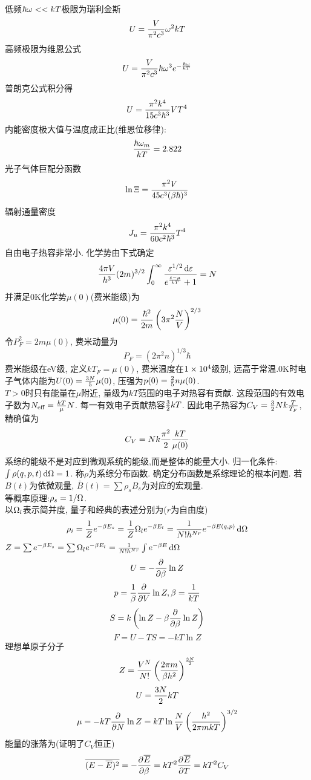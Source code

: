\documentclass[UTF8,8pt]{ctexart}
\newcommand{\q}[1]{{\color{red} #1}}
\begin{document}
\begin{multicols}{3}
低频$\hbar\omega<<kT$极限为瑞利金斯
$$U=\frac{V}{\pi^2c^3}\omega^2kT$$
高频极限为维恩公式
$$U=\frac{V}{\pi^2c^3}\hbar\omega^3e^{-\frac{\hbar\omega}{kT}}$$
普朗克公式积分得
$$U=\frac{\pi^2k^4}{15c^3\hbar^3}VT^4$$
内能密度极大值与温度成正比(维恩位移律):
$$\frac{\hbar\omega_m}{kT}=2.822$$
光子气体巨配分函数
$$\ln\Xi=\frac{\pi^2V}{45c^3(\beta\hbar)^3}$$
辐射通量密度
$$J_u=\frac{\pi^2k^4}{60c^2\hbar^3}T^4$$
自由电子热容非常小. 化学势由下式确定
$$\frac{4\pi V}{h^3}(2m)^{3/2}\int_0^\infty \frac{\varepsilon^{1/2}\mathop{}\!\mathrm{d}\varepsilon}{e^{\frac{\varepsilon-\mu}{kT}}+1}=N$$
并满足0K化学势$\mu(0)$(费米能级)为
$$\mu(0)=\frac{\hbar^2}{2m}\left( 3\pi^2\frac{N}{V} \right)^{2/3}$$
令$P_F^2=2m\mu(0)$, 费米动量为
$$P_F=(2\pi^2n)^{1/3}\hbar$$
费米能级在eV级, 定义$kT_F=\mu(0)$, 费米温度在$1\times 10^{4}$级别, 远高于常温.0K时电子气体内能为$U(0)=\frac{3N}{5}\mu(0)$, 压强为$p(0)=\frac{2}{5}n\mu(0)$. \\
$T>0$时只有能量在$\mu$附近, 量级为$kT$范围的电子对热容有贡献. 这段范围的有效电子数为$N_{\text{eff}}=\frac{kT}{\mu}N$. 每一有效电子贡献热容$\frac{3}{2}kT$. 因此电子热容为$C_V=\frac{3}{2}Nk\frac{T}{T_F}$, 精确值为
$$C_V=Nk\frac{\pi^2}{2}\frac{kT}{\mu(0)}$$
系综的能级不是对应到微观系统的能级,而是整体的能量大小. 
归一化条件:$\int\rho(q,p,t)\mathop{}\!\mathrm{d}\Omega=1$. 称$\rho$为系综分布函数. \q{确定分布函数是系综理论的根本问题}. 若$B(t)$为依微观量, $\bar{B}(t)=\sum \rho_sB_s$为对应的宏观量. \\
等概率原理:$\rho_s=1/\Omega$.\\
以$\Omega_l$表示简并度, 量子和经典的表述分别为($r$为自由度)
$$\rho_i=\frac{1}{Z}e^{-\beta E_s} = \frac{1}{Z}\Omega_le^{-\beta E_l} = \frac{1}{N!h^{Nr}}e^{-\beta E(q,p)}\mathop{}\!\mathrm{d}\Omega$$
$Z=\sum e^{-\beta E_s}=\sum\Omega_le^{-\beta E_l}=\frac{1}{N!h^{Nr}}\int e^{-\beta E}\mathop{}\!\mathrm{d}\Omega$
$$U = -\frac{\partial^{} }{\partial {\beta}^{}}\ln Z$$
$$p = \frac{1}{\beta}\frac{\partial^{} }{\partial {V}^{}}\ln Z, \beta=\frac{1}{kT}$$
$$S = k\left( \ln Z-\beta\frac{\partial^{} }{\partial {\beta}^{}}\ln Z \right)$$
$$F=U-TS=-kT\ln Z$$
理想单原子分子
$$Z=\frac{V^N}{N!}\left( \frac{2\pi m}{\beta h^2} \right)^{\frac{3N}{2}}$$
$$U=\frac{3N}{2}kT$$
$$\mu=-kT\frac{\partial^{} }{\partial {N}^{}}\ln Z=kT\ln\frac{N}{V}\left( \frac{h^2}{2\pi mkT} \right)^{3/2}$$
能量的涨落为(证明了$C_V$恒正)
$$\overline{(E-\overline{E})^2}=-\frac{\partial^{} \overline{E}}{\partial {\beta}^{}}=kT^2\frac{\partial^{} \overline{E}}{\partial {T}^{}}=kT^2C_V $$


\end{multicols}
\end{document}
